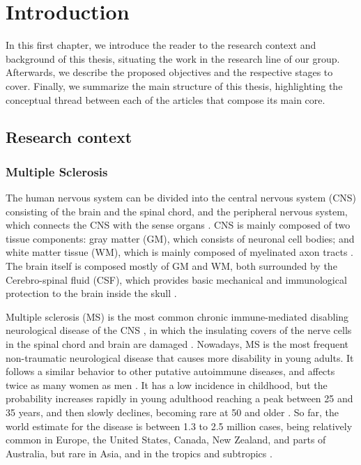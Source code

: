 \chapter{Introduction}


In this first chapter, we introduce the reader to the research context and background of this thesis, situating the work in the research line of our group. Afterwards, we describe the proposed objectives and the respective stages to cover. Finally, we summarize the main structure of this thesis, highlighting the conceptual thread between each of the articles that compose its main core. 

\section{Research context}
\label{sec:introduction_research_context}

\subsection{Multiple Sclerosis}
\label{sub:introduction_multiple_sclerosis}

The human nervous system can be divided into the central nervous system (CNS) consisting of the brain and the spinal chord, and the peripheral nervous system, which connects the CNS with the sense organs \cite{Brodal2010}. CNS is mainly composed of two tissue components: gray matter (GM), which consists of neuronal cell bodies; and white matter tissue (WM), which is mainly composed of myelinated axon tracts \cite{Sperber2006}. The brain itself is composed mostly of GM and WM, both surrounded by the Cerebro-spinal fluid (CSF), which provides basic mechanical and immunological protection to the brain inside the skull \cite{Sperber2006}. 

Multiple sclerosis (MS) is the most common chronic immune-mediated disabling neurological disease of the CNS \cite{Steinman1996}, in which the insulating covers of the nerve cells in the spinal chord and brain are damaged \cite{Compston2008}. Nowadays, MS is the most frequent non-traumatic neurological disease that causes more disability in young adults. It follows a similar behavior to other putative autoimmune diseases, and affects twice as many women as men \cite{Confavreux1980}. It has a low incidence in childhood, but the probability increases rapidly in young adulthood reaching a peak between 25 and 35 years, and then slowly declines, becoming rare at 50 and older \cite{Cabezas2011}. So far, the world estimate for the disease is between 1.3 to 2.5 million cases, being relatively common in Europe, the United States, Canada, New Zealand, and parts of Australia, but rare in Asia, and in the tropics and subtropics \cite{Cabezas2011}. 

